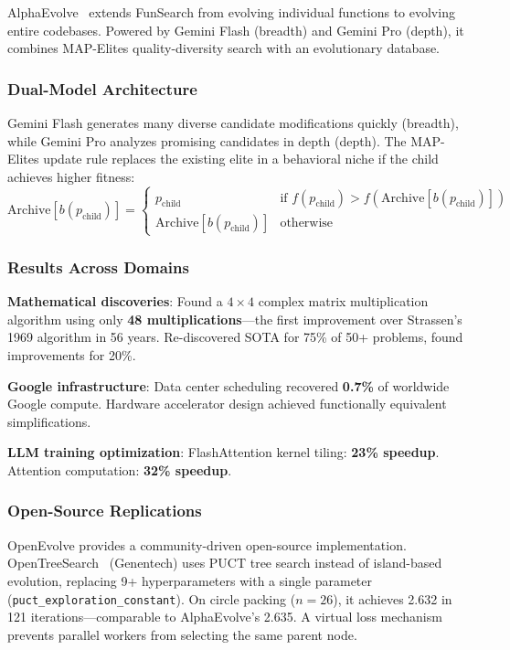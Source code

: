 AlphaEvolve~\citep{novikov2025alphaevolve} extends FunSearch from evolving individual functions to evolving entire codebases. Powered by Gemini Flash (breadth) and Gemini Pro (depth), it combines MAP-Elites quality-diversity search with an evolutionary database.

\subsubsection{Dual-Model Architecture}

Gemini Flash generates many diverse candidate modifications quickly (breadth), while Gemini Pro analyzes promising candidates in depth (depth). The MAP-Elites update rule replaces the existing elite in a behavioral niche if the child achieves higher fitness:
\begin{equation}
\text{Archive}[b(p_{\text{child}})] = \begin{cases} p_{\text{child}} & \text{if } f(p_{\text{child}}) > f(\text{Archive}[b(p_{\text{child}})]) \\ \text{Archive}[b(p_{\text{child}})] & \text{otherwise} \end{cases}
\end{equation}

\subsubsection{Results Across Domains}

\textbf{Mathematical discoveries}: Found a $4\times 4$ complex matrix multiplication algorithm using only \textbf{48 multiplications}---the first improvement over Strassen's 1969 algorithm in 56 years. Re-discovered SOTA for 75\% of 50+ problems, found improvements for 20\%.

\textbf{Google infrastructure}: Data center scheduling recovered \textbf{0.7\%} of worldwide Google compute. Hardware accelerator design achieved functionally equivalent simplifications.

\textbf{LLM training optimization}: FlashAttention kernel tiling: \textbf{23\% speedup}. Attention computation: \textbf{32\% speedup}.

\subsubsection{Open-Source Replications}

OpenEvolve provides a community-driven open-source implementation. OpenTreeSearch~\citep{opentreesearch2025} (Genentech) uses PUCT tree search instead of island-based evolution, replacing 9+ hyperparameters with a single parameter (\texttt{puct\_exploration\_constant}). On circle packing ($n{=}26$), it achieves 2.632 in 121 iterations---comparable to AlphaEvolve's 2.635. A virtual loss mechanism prevents parallel workers from selecting the same parent node.

